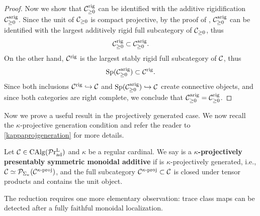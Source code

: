 \documentclass[a4paper,10pt, oneside]{amsart}
\begin{document}
\begin{proof}
		Now we show that $\mathcal{C}^\mathrm{rig}_{\geq 0}$ can be identified with the additive rigidification $\mathcal{C}_{\geq0}^\mathrm{arig}$.  Since the unit of $\mathcal{C}_{\geq0}$ is compact projective, by the proof of \cite[Corollary 4.73]{ramzi2024locally}, $\mathcal{C}_{\geq0}^\mathrm{arig}$ can be identified with the largest additively rigid full subcategory of $\mathcal{C}_{\geq0}$, thus $$\mathcal{C}^\mathrm{rig}_{\geq 0}\subset \mathcal{C}_{\geq0}^\mathrm{arig}.$$ 
		On the other hand, $\mathcal{C}^\mathrm{rig}$ is the largest stably rigid full subcategory of $\mathcal{C}$, thus $$\mathrm{Sp}(\mathcal{C}_{\geq0}^\mathrm{arig})\subset \mathcal{C}^\mathrm{rig}.$$ Since both inclusions $\mathcal{C}^\mathrm{rig}\hookrightarrow\mathcal{C}$ and $\mathrm{Sp}(\mathcal{C}_{\geq0}^\mathrm{arig})\hookrightarrow\mathcal{C}$ create connective objects, and since both categories are right complete, we conclude that $\mathcal{C}_{\geq0}^\mathrm{arig}=\mathcal{C}^\mathrm{rig}_{\geq 0}$.
	\end{proof}
	
	Now we prove a useful result in the projectively generated case. We now recall the $\kappa$-projective generation condition and refer the reader to \cref{kappaprojgeneration} for more details. 
	\begin{de}
		Let $\mathcal{C}\in\operatorname{CAlg}(\mathcal{P}\mathrm{r}_{\mathrm{ad}}^\mathrm{L})$ and $\kappa$ be a regular cardinal. We say \mcc is a \textbf{$\kappa$-projectively presentably symmetric monoidal additive \infcat} if \mcc is $\kappa$-projectively generated, i.e., $\mathcal{C}\simeq\mathcal{P}_{\Sigma_\kappa}(\mathcal{C}^{\kappa\text{-}\mathrm{proj}})$, and the full subcategory $\mathcal{C}^{\kappa\text{-}\mathrm{proj}}\subset \mathcal{C}$ is closed under tensor products and contains the unit object.
	\end{de}
The reduction requires one more elementary observation: trace class maps can be detected after a fully faithful monoidal localization.
\end{document}
